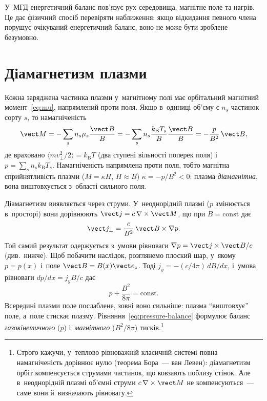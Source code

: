У~МГД енергетичний баланс пов'язує рух середовища, магнітне поле та нагрів. Це дає
фізичний спосіб перевіряти наближення: якщо відкидання певного члена порушує очікуваний
енергетичний баланс, воно не може бути зроблене безумовно.


\section{Діамагнетизм плазми}\label{sec:diamagnetism}



Кожна заряджена частинка плазми у~магнітному полі має орбітальний магнітний
момент~\eqref{eq:mu}, напрямлений проти поля. Якщо в~одиниці об'єму є $n_s$ частинок сорту
$s$, то намагніченість
\begin{equation*}
	\vect M=-\sum_sn_s\mu_s\frac{\vect B}{B}=-\sum_sn_s\frac{k_{\mathrm B}T_s}{B}\frac{\vect B}{B}=-\frac p{B^2}\,\vect B,
\end{equation*}
де враховано $\langle mv_\perp^2/2\rangle=k_{\mathrm B}T$ (два ступені вільності поперек
поля) і~$p=\sum_sn_sk_{\mathrm B}T_s$. Намагніченість напрямлена проти поля, тобто
магнітна сприйнятливість плазми ($M=\kappa H$, $H\approx B$) $\kappa=-p/B^2<0$: плазма
\emph{діамагнітна}, вона виштовхується з~області сильного поля.

Діамагнетизм виявляється через струми. У~неоднорідній плазмі ($p$ змінюється в~просторі)
вони дорівнюють $\vect j=c\,\nabla\times\vect M$, що при $B=\mathrm{const}$ дає
\begin{equation}\label{eq:diamagnetic-current}
	\vect j_\perp=\frac{c}{B^2}\,\vect B\times\nabla p.
\end{equation}
Той самий результат одержується з~умови рівноваги $\nabla p=\vect j\times\vect B/c$
(див.~нижче). Щоб побачити наслідок, розглянемо плоский шар, у~якому $p=p(x)$ і~поле
$\vect B=B(x)\vect e_z$. Тоді $j_y=-(c/4\pi)\,dB/dx$, і~умова рівноваги $dp/dx=j_yB/c$ дає
\begin{equation}\label{eq:pressure-balance}
	p+\frac{B^2}{8\pi}=\mathrm{const}.
\end{equation}
Всередині плазми поле послаблене, зовні воно сильніше: плазма \enquote{виштовхує} поле,
а~поле стискає плазму. Рівняння~\eqref{eq:pressure-balance} формулює баланс
\emph{газокінетичного} ($p$) і~\emph{магнітного} ($B^2/8\pi$) тисків.\footnote{Строго
кажучи, у~теплово рівноважній класичній системі повна намагніченість дорівнює нулю
(теорема Бора~--- ван Левен): діамагнетизм орбіт компенсується струмами частинок, що
ковзають поблизу стінок. Але в~неоднорідній плазмі об'ємні струми $c\,\nabla\times\vect M$
не компенсуються~--- саме вони й~визначають рівновагу.}



